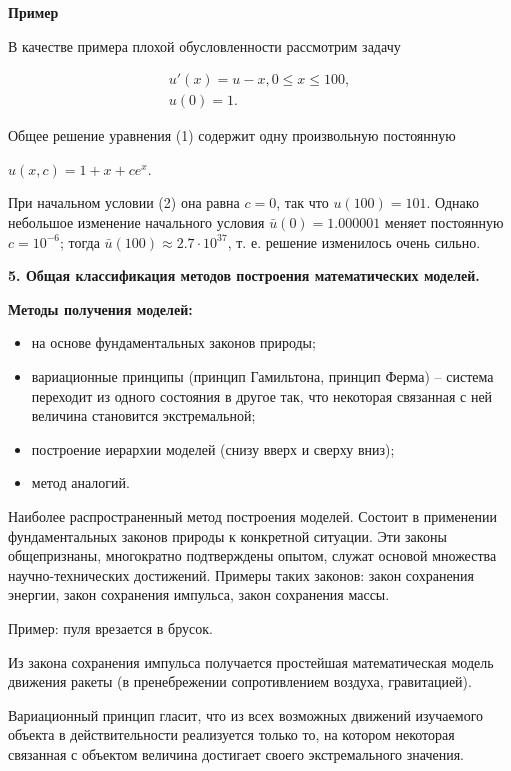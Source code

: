 \documentclass[a4paper,14pt]{article}
\begin{document}
\textbf{Пример}

В качестве примера плохой обусловленности рассмотрим задачу

\begin{eqnarray}
	u'(x) = u - x, 0 \leq x \leq 100, \\
	u(0) = 1.
\end{eqnarray}


Общее решение уравнения (1) содержит одну произвольную постоянную 

$u(x, c) = 1 + x + c e^x$.

При начальном условии (2) она равна $c = 0$, так что $u(100) = 101$. 
Однако небольшое изменение начального условия $\bar{u}(0) = 1.000001$ меняет постоянную
$c = 10^{-6}$; тогда $\bar{u}(100) \approx 2.7 \cdot 10^{37}$, т. е.
решение изменилось очень сильно.

\newpage
\textbf{5. Общая классификация методов построения математических моделей.}

\textbf{Методы получения моделей:}

\begin{itemize}
	\item на основе фундаментальных законов природы;
	\item вариационные принципы (принцип Гамильтона, принцип Ферма) -- 
	система переходит из одного состояния в другое так, что некоторая связанная с ней
	величина становится экстремальной;
	\item построение иерархии моделей (снизу вверх и сверху вниз);
	\item метод аналогий.
\end{itemize}

Наиболее распространенный метод построения моделей.
Состоит в применении фундаментальных законов природы к 
конкретной ситуации. Эти законы общепризнаны, 
многократно подтверждены опытом, служат основой множества 
научно-технических достижений. Примеры таких законов: закон 
сохранения энергии, закон сохранения импульса, закон сохранения массы.

Пример: пуля врезается в брусок.

Из закона сохранения импульса получается простейшая 
математическая модель движения ракеты (в пренебрежении сопротивлением
воздуха, гравитацией).

Вариационный принцип гласит, что из всех возможных движений 
изучаемого объекта в действительности реализуется только то,
на котором некоторая связанная 
с объектом величина достигает своего экстремального значения.
\end{document}
